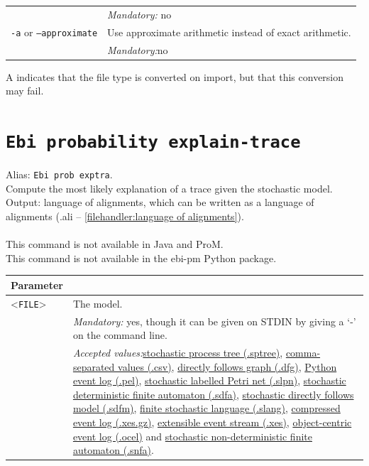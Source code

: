 {\begin{tabularx}{\linewidth}{lX}
&\textit{Mandatory:} \quad no\\
\texttt{-a} or \texttt{--approximate} & Use approximate arithmetic instead of exact arithmetic.\\
&\textit{Mandatory:}\quad no\\
\bottomrule
\end{tabularx}
A \textdagger{} indicates that the file type is converted on import, but that this conversion may fail.
\clearpage\section{\texttt{Ebi probability explain-trace}}
\label{command:Ebi probability explain-trace}
Alias: \texttt{Ebi prob exptra}.\\
Compute the most likely explanation of a trace given the stochastic model.\\
\noindent Output: language of alignments, which can be written as a language of alignments (.ali -- \cref{filehandler:language of alignments}).\\
\\This command is not available in Java and ProM.
\\This command is not available in the ebi-pm Python package.
\begin{tabularx}{\linewidth}{lX}
\toprule
Parameter \\\midrule
<\texttt{FILE}>&The model.\\
&\textit{Mandatory:} \quad yes, though it can be given on STDIN by giving a `-' on the command line.\\
&\textit{Accepted values:}\quad \hyperref[filehandler:stochastic process tree]{stochastic process tree (.sptree)}, \hyperref[filehandler:comma-separated values]{comma-separated values (.csv)}, \hyperref[filehandler:directly follows graph]{directly follows graph (.dfg)}, \hyperref[filehandler:Python event log]{Python event log (.pel)}, \hyperref[filehandler:stochastic labelled Petri net]{stochastic labelled Petri net (.slpn)}, \hyperref[filehandler:stochastic deterministic finite automaton]{stochastic deterministic finite automaton (.sdfa)}, \hyperref[filehandler:stochastic directly follows model]{stochastic directly follows model (.sdfm)}, \hyperref[filehandler:finite stochastic language]{finite stochastic language (.slang)}, \hyperref[filehandler:compressed event log]{compressed event log (.xes.gz)}, \hyperref[filehandler:extensible event stream]{extensible event stream (.xes)}, \hyperref[filehandler:object-centric event log]{object-centric event log (.ocel)} and \hyperref[filehandler:stochastic non-deterministic finite automaton]{stochastic non-deterministic finite automaton (.snfa)}.\\

\end{tabularx}}
